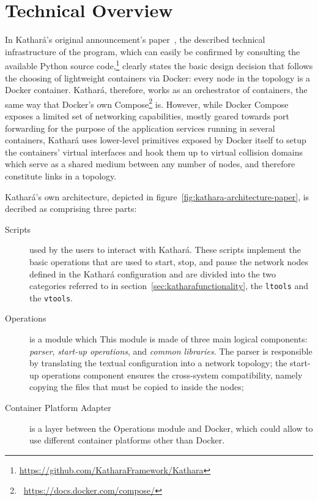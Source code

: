 \section{Technical Overview}
\label{sec:katharatechnicaloverview}

In Kathará's original announcement's paper~\cite{kathara}, the described technical infrastructure of the program, which can easily be confirmed by consulting the available Python source code,\footnote{\mbox{\url{https://github.com/KatharaFramework/Kathara}}} clearly states the basic design decision that follows the choosing of lightweight containers via Docker: every node in the topology is a Docker container.
Kathará, therefore, works as an orchestrator of containers, the same way that Docker's own Compose\footnote{~\mbox{\url{https://docs.docker.com/compose/}}} is.
However, while Docker Compose exposes a limited set of networking capabilities, mostly geared towards port forwarding for the purpose of the application services running in several containers, Kathará uses lower-level primitives exposed by Docker itself to setup the containers' virtual interfaces and hook them up to virtual collision domains which serve as a shared medium between any number of nodes, and therefore constitute links in a topology.



Kathará's own architecture, depicted in figure~\ref{fig:kathara-architecture-paper}, is decribed as comprising three parts:
\begin{description}
  \item[Scripts] used by the users to interact with Kathará.
  These scripts implement the basic operations that are used to start, stop, and pause the network nodes defined in the Kathará configuration and are divided into the two categories referred to in section~\ref{sec:katharafunctionality}, the \texttt{ltools} and the \texttt{vtools}.
  \item[Operations] is a module which 
  This module is made of three main logical components: \emph{parser}, \emph{start-up operations}, and \emph{common libraries}.
  The parser is responsible by translating the textual configuration into a network topology; the start-up operations component ensures the cross-system compatibility, namely copying the files that must be copied to inside the nodes;
  \item[Container Platform Adapter] is a layer between the Operations module and Docker, which could allow to use different container platforms other than Docker.
\end{description}

